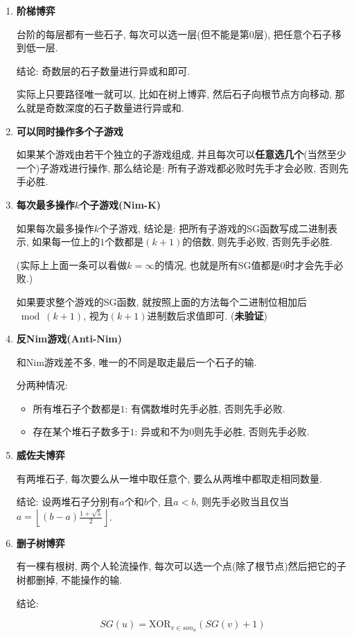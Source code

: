 \begin{enumerate}

\item \textbf{阶梯博弈}

台阶的每层都有一些石子, 每次可以选一层(但不能是第$0$层), 把任意个石子移到低一层.

结论: 奇数层的石子数量进行异或和即可.

实际上只要路径唯一就可以, 比如在树上博弈, 然后石子向根节点方向移动, 那么就是奇数深度的石子数量进行异或和.

\item \textbf{可以同时操作多个子游戏}

如果某个游戏由若干个独立的子游戏组成, 并且每次可以\textbf{任意选几个}(当然至少一个)子游戏进行操作, 那么结论是: 所有子游戏都必败时先手才会必败, 否则先手必胜.

\item \textbf{每次最多操作$k$个子游戏(Nim-K)}

如果每次最多操作$k$个子游戏, 结论是: 把所有子游戏的SG函数写成二进制表示, 如果每一位上的$1$个数都是$(k+1)$的倍数, 则先手必败, 否则先手必胜.

(实际上上面一条可以看做$k=\infty$的情况, 也就是所有SG值都是$0$时才会先手必败.)

如果要求整个游戏的SG函数, 就按照上面的方法每个二进制位相加后$\bmod (k+1)$, 视为$(k+1)$进制数后求值即可. (\textbf{未验证})

\item \textbf{反Nim游戏(Anti-Nim)}

和Nim游戏差不多, 唯一的不同是取走最后一个石子的输.

分两种情况:

\begin{itemize}
	\item 所有堆石子个数都是$1$: 有偶数堆时先手必胜, 否则先手必败.
	\item 存在某个堆石子数多于$1$: 异或和不为$0$则先手必胜, 否则先手必败.
\end{itemize}

\item \textbf{威佐夫博弈}

有两堆石子, 每次要么从一堆中取任意个, 要么从两堆中都取走相同数量.

结论: 设两堆石子分别有$a$个和$b$个, 且$a<b$, 则先手必败当且仅当$a = \left\lfloor (b-a)\frac {1 + \sqrt 5} 2 \right\rfloor$.

\item \textbf{删子树博弈}

有一棵有根树, 两个人轮流操作, 每次可以选一个点(除了根节点)然后把它的子树都删掉, 不能操作的输.

结论:

$$ SG(u) = \text{XOR} _{v \in son_u} \left( SG(v) + 1 \right) $$

\end{enumerate}
